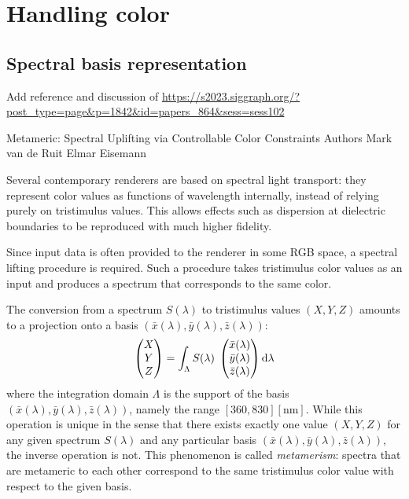 
\chapter{Handling color}\label{ch:color}

\section{Spectral basis representation}
\label{sec:spec_basis}

\begin{inconstruction}
	Add reference and discussion of \url{https://s2023.siggraph.org/?post_type=page&p=1842&id=papers_864&sess=sess102}
	
	Metameric: Spectral Uplifting via Controllable Color Constraints
	Authors Mark van de Ruit
	Elmar Eisemann
\end{inconstruction}

Several contemporary renderers are based on spectral light transport: 
they represent color values as functions of wavelength
internally, instead of relying purely on tristimulus values.
This allows effects such as dispersion at dielectric boundaries 
to be reproduced with much higher fidelity.

Since input data is often provided to the renderer in some \gls{RGB} space,
a spectral lifting procedure is required. Such a procedure takes
tristimulus color values as an input and produces a spectrum that
corresponds to the same color.

The conversion from a spectrum $S(\lambda)$ to tristimulus values 
$(X, Y, Z)$ amounts to a projection onto a basis $(\bar x(\lambda), \bar y(\lambda), \bar z(\lambda))$:
\begin{equation}
    \begin{pmatrix}X\\Y\\Z\end{pmatrix}
        = \int_\Lambda S(\lambda)\; 
    \begin{pmatrix}
        \bar x(\lambda)\\
        \bar y(\lambda)\\
        \bar z(\lambda)
    \end{pmatrix}
    \mathop{}\!\mathrm{d}\lambda
    \label{eqn:color_matching}
\end{equation}
where the integration domain $\Lambda$ is the support of the basis 
$(\bar x(\lambda),\bar y(\lambda), \bar z(\lambda))$,
namely the range $[360,830] [\unit{\nano\meter}]$.
While this operation is unique in the sense that there exists exactly one
value $(X,Y,Z)$ for any given spectrum $S(\lambda)$ and any particular basis
$(\bar x(\lambda),\bar y(\lambda), \bar z(\lambda))$, the inverse operation is not. This phenomenon is called
\emph{metamerism}: spectra that are metameric to each other correspond to the
same tristimulus color value with respect to the given basis.

